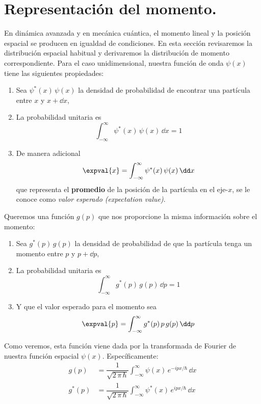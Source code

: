 \section{Representación del momento.}
En dinámica avanzada y en mecánica cuántica, el momento lineal y la posición espacial se producen en igualdad de condiciones. En esta sección revisaremos la distribución espacial habitual y derivaremos la distribución de momento correspondiente. Para el caso unidimensional, nuestra función de onda $\psi(x)$ tiene las siguientes propiedades:
\begin{enumerate}
\item Sea $\psi^{*}(x) \, \psi(x)$ la densidad de probabilidad de encontrar una partícula entre $x$ y $x + \dd{x}$,
\item La probabilidad unitaria es
\begin{equation}
\int_{-\infty}^{\infty} \psi^{*}(x) \, \psi(x) \, \dd x = 1
\label{eq:ecuacion_15_58}
\end{equation}
\item De manera adicional
\begin{equation}
\expval{x} = \int_{-\infty}^{\infty} \psi^{*} (x) \, \psi (x) \, \dd x
\label{eq:ecuacion_15_59}   
\end{equation}
que representa el \textbf{promedio} de la posición de la partícula en el eje-$x$, se le conoce como \emph{valor esperado (expectation value)}.
\end{enumerate}
Queremos una función $g(p)$ que nos proporcione la misma información sobre el momento:
\begin{enumerate}
\item Sea $g^{*}(p) \, g(p)$ la densidad de probabilidad de que la partícula tenga un momento entre $p$ y $p + \dd{p}$,
\item La probabilidad unitaria es
\begin{equation}
\int_{-\infty}^{\infty} g^{*}(p) \, g(p) \, \dd p = 1
\label{eq:ecuacion_15_60}
\end{equation}
\item Y que el valor esperado para el momento sea
\begin{equation}
\expval{p} = \int_{-\infty}^{\infty} g^{*} (p) \, p \, g(p) \, \dd p
\label{eq:ecuacion_15_61}   
\end{equation}
\end{enumerate}
Como veremos, esta función viene dada por la transformada de Fourier de nuestra función espacial $\psi(x)$. Específicamente:
\begin{align}
g (p) &= \dfrac{1}{\sqrt{2 \, \pi \, \hbar}} \int_{-\infty}^{\infty} \psi (x) \, e^{-i p x / \hbar} \, \dd x \label{eq:ecuacion_15_62} \\
g^{*} (p) &= \dfrac{1}{\sqrt{2 \, \pi \, \hbar}} \int_{-\infty}^{\infty} \psi^{*} (x) \, e^{i p x / \hbar} \, \dd x \label{eq:ecuacion_15_63}
\end{align}
